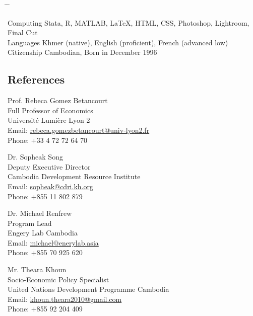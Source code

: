\documentclass[10pt,a4paper]{article}
\newcommand{\tabbedblock}[1]{

	\begin{tabbing}
		\hspace{2cm} \= \hspace{4cm} \= \kill
		#1
	\end{tabbing}
}
\begin{document}
\tabbedblock{
	Computing \> Stata, R, MATLAB, \LaTeX, HTML, CSS, Photoshop, Lightroom, Final Cut\\
	
	Languages \> Khmer (native), English (proficient), French (advanced low)\\
	
	Citizenship \> Cambodian, Born in December 1996
}


\subsection*{References}		

\parbox{0.5\textwidth}{ %
	Prof. Rebeca Gomez Betancourt\\ 
	Full Professor of Economics\\ 
	Université Lumière Lyon 2\\
	Email: \href{mailto: Phone: rebeca.gomezbetancourt@univ-lyon2.fr}{rebeca.gomezbetancourt@univ-lyon2.fr}\\
	Phone: +33 4 72 72 64 70
}
\hfill %
\parbox{0.5\textwidth}{ %
	Dr. Sopheak Song\\ 
	Deputy Executive Director \\
	Cambodia Development Resource Institute\\ 
	Email: \href{mailto: sopheak@cdri.kh.org}{sopheak@cdri.kh.org}\\
	Phone: +855 11 802 879
}

\vspace{1.5em}
\parbox{0.5\textwidth}{ %
	Dr. Michael Renfrew\\ 
	Program Lead\\
	Engery Lab Cambodia\\ 
	Email: \href{mailto: michael@enerylab.asia}{michael@enerylab.asia}\\
	Phone: +855 70 925 620
}
\hfill %
\parbox{0.5\textwidth}{ %
	Mr. Theara Khoun \\ 
	Socio-Economic Policy Specialist \\
	United Nations Development Programme Cambodia\\
	Email: \href{mailto: khoun.theara2010@gmail.com}{khoun.theara2010@gmail.com}\\
	Phone: +855 92 204 409\\
}
\end{document}

